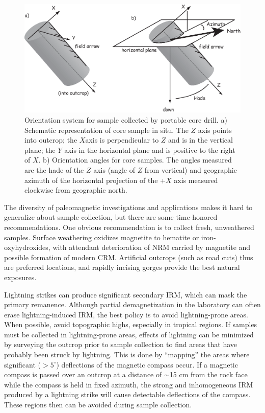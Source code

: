 \begin{figure}[htb]
\centering  \includegraphics[width=12 cm]{EPSfiles/orientation.eps}
\caption{Orientation system for sample collected by portable core drill. a)  Schematic
representation of core sample in situ. The $Z$ axis points into outcrop; the $X $axis is perpendicular to $Z$ and is in the vertical
plane; the $Y$ axis in the  horizontal plane and is positive to the right of $X$.  b) Orientation angles for core samples. The
angles measured are the hade of the $Z$ axis (angle of $Z$ from vertical) and geographic azimuth of the
horizontal projection of the +$X$ axis measured clockwise from geographic north.   }
\label{fig:orientation}
\end{figure}



The diversity of paleomagnetic investigations and applications makes it hard to generalize about sample
collection, but there are some time-honored recommendations. One obvious recommendation is to collect
fresh, unweathered samples. Surface weathering oxidizes magnetite to hematite or iron-oxyhydroxides,
with attendant deterioration of NRM carried by magnetite and possible formation of modern CRM. Artificial
outcrops (such as road cuts) thus are preferred locations, and rapidly incising gorges provide the best
natural exposures.

Lightning strikes can produce significant secondary IRM, which can mask the primary remanence. Although partial
demagnetization in the laboratory can often erase lightning-induced IRM, the best policy is to avoid lightning-prone areas. When possible, avoid  topographic highs, especially in tropical regions. If samples
must be collected in lightning-prone areas, effects of lightning can be minimized by surveying the outcrop prior to sample collection to
find areas that have probably been struck by lightning. This is done by ``mapping'' the areas where
significant ($>5^{\circ}$) deflections of the magnetic compass occur. If a magnetic compass is passed over
an outcrop at a distance of $\sim$15 cm from the rock face while the compass is held in fixed azimuth, the
strong and inhomogeneous IRM produced by a lightning strike will cause detectable deflections of
the compass. These regions then can be avoided during sample collection.
 
